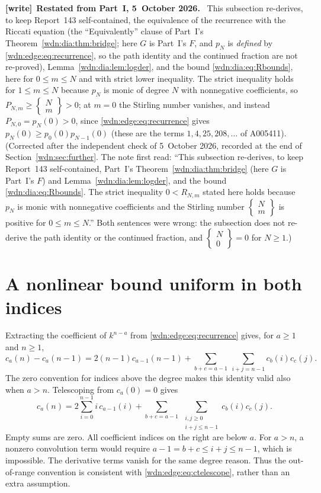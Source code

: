 \documentclass[11pt,letterpaper]{article}
\theoremstyle{remark}\newtheorem{remark}[theorem]{Remark}
\newcommand{\stir}[2]{\left\{\begin{matrix}#1\\#2\end{matrix}\right\}}
\newenvironment{writenote}[1][]{\par\smallskip\begingroup\small
 \noindent\textbf{[write]}\if\relax\detokenize{#1}\relax\else~\textbf{#1.}\fi\ }%
 {\par\endgroup\smallskip}
\begin{document}
\begin{writenote}[Restated from Part~I, 5~October 2026]
This subsection re-derives, to keep Report~143 self-contained, the equivalence of the recurrence with the Riccati equation (the ``Equivalently'' clause of Part~I's Theorem~\ref{wdn:dia:thm:bridge}; here $G$ is Part~I's $F$, and $p_N$ is \emph{defined} by \eqref{wdn:edge:eq:recurrence}, so the path identity and the continued fraction are not re-proved), Lemma~\ref{wdn:dia:lem:logder}, and the bound \eqref{wdn:dia:eq:Rbounds}, here for $0\le m\le N$ and with strict lower inequality. The strict inequality holds for $1\le m\le N$ because $p_N$ is monic of degree $N$ with nonnegative coefficients, so $P_{N,m}\ge\stir Nm>0$; at $m=0$ the Stirling number vanishes, and instead $P_{N,0}=p_N(0)>0$, since \eqref{wdn:edge:eq:recurrence} gives $p_N(0)\ge p_0(0)p_{N-1}(0)$ (these are the terms $1,4,25,208,\ldots$ of A005411). \textup{(Corrected after the independent check of 5~October 2026, recorded at the end of Section~\ref{wdn:sec:further}. The note first read: ``This subsection re-derives, to keep Report~143 self-contained, Part~I's Theorem~\ref{wdn:dia:thm:bridge} (here $G$ is Part~I's $F$) and Lemma~\ref{wdn:dia:lem:logder}, and the bound \eqref{wdn:dia:eq:Rbounds}. The strict inequality $0<R_{N,m}$ stated here holds because $p_N$ is monic with nonnegative coefficients and the Stirling number $\stir Nm$ is positive for $0\le m\le N$.'' Both sentences were wrong: the subsection does not re-derive the path identity or the continued fraction, and $\stir N0=0$ for $N\ge1$.)}
\end{writenote}

\section{A nonlinear bound uniform in both indices}\label{wdn:edge:sec:topproof}
Extracting the coefficient of $k^{n-a}$ from
\eqref{wdn:edge:eq:recurrence} gives, for $a\ge1$ and $n\ge1$,
\[
 c_a(n)-c_a(n-1)=2(n-1)c_{a-1}(n-1)
       +\sum_{b+c=a-1}\ \sum_{i+j=n-1}c_b(i)c_c(j).
\]
The zero convention for indices above the degree makes this identity
valid also when $a>n$. Telescoping from $c_a(0)=0$ gives
\begin{equation}\label{wdn:edge:eq:ctelescope}
 c_a(n)=2\sum_{i=0}^{n-1}i\,c_{a-1}(i)
 +\sum_{b+c=a-1}\ \sum_{\substack{i,j\ge0\\i+j\le n-1}}c_b(i)c_c(j).
\end{equation}
Empty sums are zero. All coefficient indices on the right are below $a$.
For $a>n$, a nonzero convolution term would require
$a-1=b+c\le i+j\le n-1$, which is impossible. The derivative terms
vanish for the same degree reason. Thus the out-of-range convention is
consistent with \eqref{wdn:edge:eq:ctelescope}, rather than an extra assumption.
\end{document}
